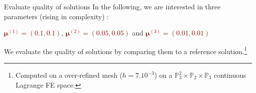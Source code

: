 \begin{frame}{Evaluate quality of solutions}
	In the following, we are interested in three parameters (rising in complexity) :

	\begin{center}
		\textcolor<2>{darkred}{$\bm{\mu}^{(1)} = (0.1,0.1)$}, \textcolor<3>{darkred}{$\bm{\mu}^{(2)} = (0.05,0.05)$} and \textcolor<4>{darkred}{$\bm{\mu}^{(3)} = (0.01,0.01)$}
	\end{center}

	We evaluate the quality of solutions by comparing them to a reference solution.\footnote[frame,1]{Computed on a over-refined mesh ($h=7.10^{-3}$) on a $\mathbb{P}_3^2\times \mathbb{P}_2 \times \mathbb{P}_3$ continuous Lagrange FE space.}

	\vspace{10pt}


	\vspace{3pt}
	\vspace{-3pt}

	\begin{center}
	\end{center}

\end{frame}